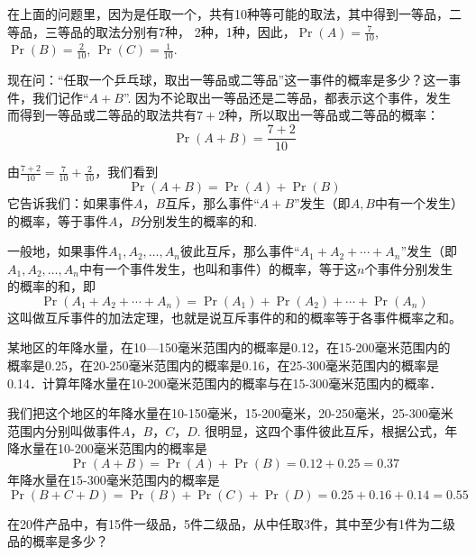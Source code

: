 在上面的问题里，因为是任取一个，共有10种等可能的取法，其中得到一等品，二等品，三等品的取法分别有7种，
2种，1种，因此，$\Pr(A)=\frac{7}{10}$, $\Pr(B)=\frac{2}{10}$, $\Pr(C)=\frac{1}{10}$.

现在问：“任取一个乒乓球，取出一等品或二等品”这一事件的概率是多少？这一事件，我们记作“$A+B$”. 因为不论取出一等品还是二等品，都表示这个事件，发生而得到一等品或二等品的取法共有$7+2$种，所以取出一等品或二等品的概率：
\[\Pr(A+B)=\frac{7+2}{10}\]

由$\frac{7+2}{10}=\frac{7}{10}+\frac{2}{10}$，我们看到
\[\Pr(A+B)=\Pr(A)+\Pr(B)\]
它告诉我们：如果事件$A$，$B$互斥，那么事件“$A+B$”发生（即$A,B$中有一个发生）的概率，等于事件$A$，$B$分别发生的概率的和.

一般地，如果事件$A_1,A_2,\ldots,A_n$彼此互斥，那么事件“$A_1+A_2+\cdots+A_n$”发生（即$A_1,A_2,\ldots,A_n$中有一个事件发生，也叫和事件）的概率，等于这$n$个事件分别发生的概率的和，即
\[\Pr(A_1+A_2+\cdots+A_n)=\Pr(A_1)+\Pr(A_2)+\cdots+\Pr(A_n)\]
这叫做互斥事件的加法定理，也就是说互斥事件的和的概率等于各事件概率之和。

\begin{example}
    某地区的年降水量，在10—150毫米范围内的概率是0.12，在15-200毫米范围内的概率是0.25，在20-250毫米范围内的概率是0.16，在25-300毫米范围内的概率是0.14．计算年降水量在10-200毫米范围内的概率与在15-300毫米范围内的概率．
\end{example}

\begin{solution}
    我们把这个地区的年降水量在10-150毫米，15-200毫米，20-250毫米，25-300毫米范围内分别叫做事件$A$，$B$，$C$，$D$. 很明显，这四个事件彼此互斥，根据公式，年降水量在10-200毫米范围内的概率是
\[\Pr(A+B)=\Pr(A)+\Pr(B)=0.12+0.25=0.37\]
年降水量在15-300毫米范围内的概率是
\[\Pr(B+C+D)=\Pr(B)+\Pr(C)+\Pr(D)=0.25+0.16+0.14=0.55\]
\end{solution}


\begin{example}
    在20件产品中，有15件一级品，5件二级品，从中任取3件，其中至少有1件为二级品的概率是多少？
\end{example}

